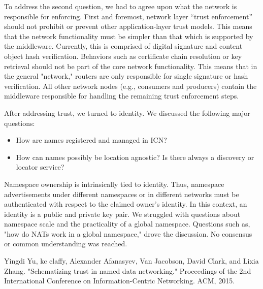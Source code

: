 \documentclass[a4paper,UKenglish]{dagrep}
\begin{document}
To address the second question, we had to agree upon what the network is responsible for enforcing.
First and foremost, network layer ``trust enforcement'' should not prohibit or prevent other application-layer trust models. This means that the network functionality must be simpler than that which is supported by the middleware. Currently, this is comprised of digital signature and content object hash verification. Behaviors such as certificate chain resolution or key retrieval should not be part of the core network functionality. This means that in the general "network," routers are only responsible for single signature or hash verification. All other network nodes (e.g., consumers and producers) contain the middleware responsible for handling the remaining trust enforcement steps.

After addressing trust, we turned to identity. We discussed the following major questions:
%
\begin{itemize}
\item How are names registered and managed in ICN?
\item How can names possibly be location agnostic? Is there always a discovery or locator service?
\end{itemize}
%
Namespace ownership is intrinsically tied to identity. Thus, namespace advertisements under different namespaces or in different networks must be authenticated with respect to the claimed owner's identity. In this context, an identity is a public and private key pair. We struggled with questions about namespace scale and the practicality of a global namespace. Questions such as, "how do NATs work in a global namespace," drove the discussion. No consensus or common understanding was reached.

\begin{thebibliography}{0}
Yingdi Yu, kc claffy, Alexander Afanasyev, Van Jacobson, David Clark, and Lixia Zhang. "Schematizing trust in named data networking." Proceedings of the 2nd International Conference on Information-Centric Networking. ACM, 2015.
\end{thebibliography}

\license
\end{document}
